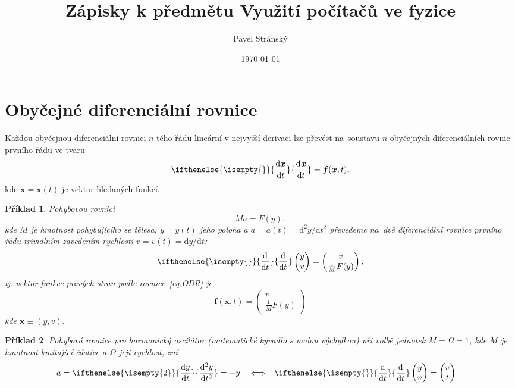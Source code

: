 \documentclass[a4paper,11pt,twoside]{article}
\def\vector#1{\boldsymbol{#1}}								%
\renewcommand{\d}{\mathrm{d}}
\newcommand{\derivative}[3][]{\ifthenelse{\isempty{#1}}	    %
	{\frac{\d{#2}}{\d{#3}}}
	{\frac{\d^{#1}{#2}}{\d{#3}^{#1}}}
}
\def\makematrix#1{\begin{pmatrix}#1\end{pmatrix}}       %
\begin{document}
\theoremstyle{spaced}
\newtheorem{example}{Příklad}[section]

\theoremstyle{red}
\newtheorem{task}{Úkol}[section]

\theoremstyle{blue}
\newtheorem{solution}{Řešení}[section]

\title{Zápisky k předmětu Využití počítačů ve fyzice}
\date{\today}
\author{Pavel Stránský}

\maketitle

\section{Obyčejné diferenciální rovnice}
    Každou obyčejnou diferenciální rovnici $n$-tého řádu lineární v nejvyšší derivaci lze převést na~soustavu $n$ obyčejných diferenciálních rovnic prvního řádu ve tvaru
    \begin{equation}\label{eq:ODR}
        \derivative{\vector{x}}{t}=\vector{f}(\vector{x},t),
    \end{equation}
    kde $\vector{x}=\vector{x}(t)$ je vektor hledaných funkcí.

\begin{example}
    Pohybovou rovnici
    \begin{equation}
        Ma=F(y),
    \end{equation}
    kde $M$ je hmotnost pohybujícího se tělesa, $y=y(t)$ jeho poloha a $a=a(t)=\d^{2}y/\d t^{2}$ převedeme na~dvě diferenciální rovnice prvního řádu triviálním zavedením rychlosti $v=v(t)=\d y/\d t$:
    \begin{equation}
        \derivative{}{t}\makematrix{y \\ v}=\makematrix{v \\ \frac{1}{M}F(y)},
    \end{equation}
    tj. vektor funkce pravých stran podle rovnice~\eqref{eq:ODR} je
    \begin{equation}
        \vector{f}(\vector{x},t)=\makematrix{v \\ \frac{1}{M}F(y)}
    \end{equation}
    kde $\vector{x}\equiv(y,v)$.
\end{example}

\begin{example}
    Pohybová rovnice pro harmonický oscilátor (matematické kyvadlo s malou výchylkou) při volbě jednotek $M=\Omega=1$, kde $M$ je hmotnost kmitající částice a $\Omega$ její rychlost, zní
    \begin{align}
        a&=\derivative[2]{y}{t}=-y &&\Longleftrightarrow &
        \derivative{}{t}\makematrix{y \\ v}&=\makematrix{v \\ t}
    \end{align}

\end{example}
\end{document}
